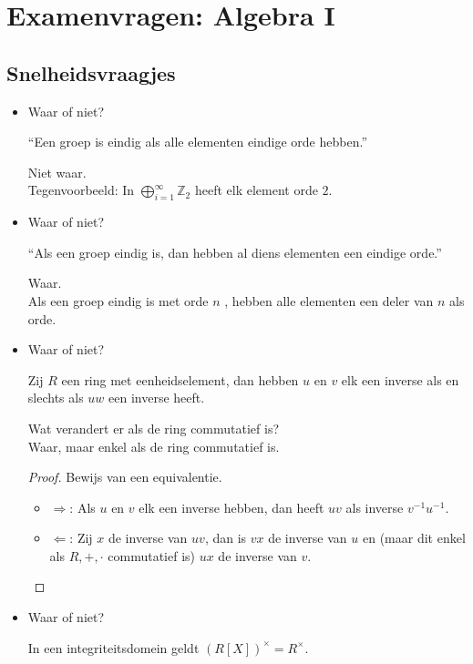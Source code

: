\documentclass[main.tex]{subfiles}
\begin{document}
\chapter{Examenvragen: Algebra I}
\label{cha:examen-a}

\section{Snelheidsvraagjes}
\label{sec:snelheidsvraagjes}

\begin{itemize}
\item Waar of niet?
  \begin{center}
    ``Een groep is eindig als alle elementen eindige orde hebben.''
  \end{center}

  Niet waar.\\
  Tegenvoorbeeld: In $\bigoplus_{i=1}^{\infty}\mathbb{Z}_{2}$ heeft elk element orde $2$.
\item Waar of niet?
  \begin{center}
    ``Als een groep eindig is, dan hebben al diens elementen een eindige orde.''
  \end{center}
  Waar.\\
  Als een groep eindig is met orde $n$ , hebben alle elementen een deler van $n$ als orde.
\item Waar of niet?
  \begin{center}
    Zij $R$ een ring met eenheidselement, dan hebben $u$ en $v$ elk een inverse als en slechts als $uw$ een inverse heeft.
  \end{center}
  Wat verandert er als de ring commutatief is?\\
  Waar, maar enkel als de ring commutatief is.
  \begin{proof}
    Bewijs van een equivalentie.
    \begin{itemize}
    \item $\Rightarrow$: Als $u$ en $v$ elk een inverse hebben, dan heeft $uv$ als inverse $v^{-1}u^{-1}$.
    \item $\Leftarrow$: Zij $x$ de inverse van $uv$, dan is $vx$ de inverse van $u$ en (maar dit enkel als $R,+,\cdot$ commutatief is) $ux$ de inverse van $v$.
    \end{itemize}
  \end{proof}
\item Waar of niet?
  \begin{center}
    In een integriteitsdomein geldt $(R[X])^{\times} = R^{\times}$.

\end{center}
\end{itemize}
\end{document}

